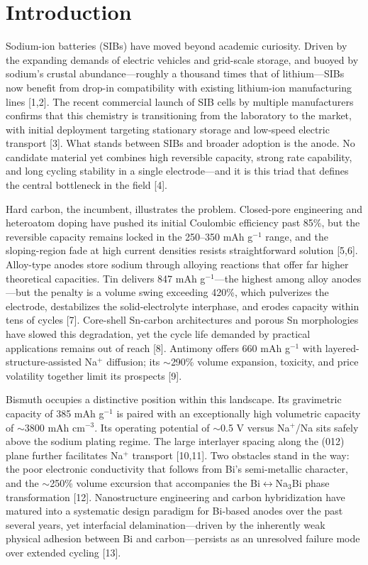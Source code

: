 \section{Introduction}

Sodium-ion batteries (SIBs) have moved beyond academic curiosity. Driven by the expanding demands of electric vehicles and grid-scale storage, and buoyed by sodium's crustal abundance---roughly a thousand times that of lithium---SIBs now benefit from drop-in compatibility with existing lithium-ion manufacturing lines [1,2]. The recent commercial launch of SIB cells by multiple manufacturers confirms that this chemistry is transitioning from the laboratory to the market, with initial deployment targeting stationary storage and low-speed electric transport [3]. What stands between SIBs and broader adoption is the anode. No candidate material yet combines high reversible capacity, strong rate capability, and long cycling stability in a single electrode---and it is this triad that defines the central bottleneck in the field [4].

Hard carbon, the incumbent, illustrates the problem. Closed-pore engineering and heteroatom doping have pushed its initial Coulombic efficiency past 85\%, but the reversible capacity remains locked in the 250--350 mAh g$^{-1}$ range, and the sloping-region fade at high current densities resists straightforward solution [5,6]. Alloy-type anodes store sodium through alloying reactions that offer far higher theoretical capacities. Tin delivers 847 mAh g$^{-1}$---the highest among alloy anodes---but the penalty is a volume swing exceeding 420\%, which pulverizes the electrode, destabilizes the solid-electrolyte interphase, and erodes capacity within tens of cycles [7]. Core-shell Sn-carbon architectures and porous Sn morphologies have slowed this degradation, yet the cycle life demanded by practical applications remains out of reach [8]. Antimony offers 660 mAh g$^{-1}$ with layered-structure-assisted Na$^{+}$ diffusion; its $\sim$290\% volume expansion, toxicity, and price volatility together limit its prospects [9].

Bismuth occupies a distinctive position within this landscape. Its gravimetric capacity of 385 mAh g$^{-1}$ is paired with an exceptionally high volumetric capacity of $\sim$3800 mAh cm$^{-3}$. Its operating potential of $\sim$0.5 V versus Na$^{+}$/Na sits safely above the sodium plating regime. The large interlayer spacing along the (012) plane further facilitates Na$^{+}$ transport [10,11]. Two obstacles stand in the way: the poor electronic conductivity that follows from Bi's semi-metallic character, and the $\sim$250\% volume excursion that accompanies the Bi$\leftrightarrow$Na$_{3}$Bi phase transformation [12]. Nanostructure engineering and carbon hybridization have matured into a systematic design paradigm for Bi-based anodes over the past several years, yet interfacial delamination---driven by the inherently weak physical adhesion between Bi and carbon---persists as an unresolved failure mode over extended cycling [13].

